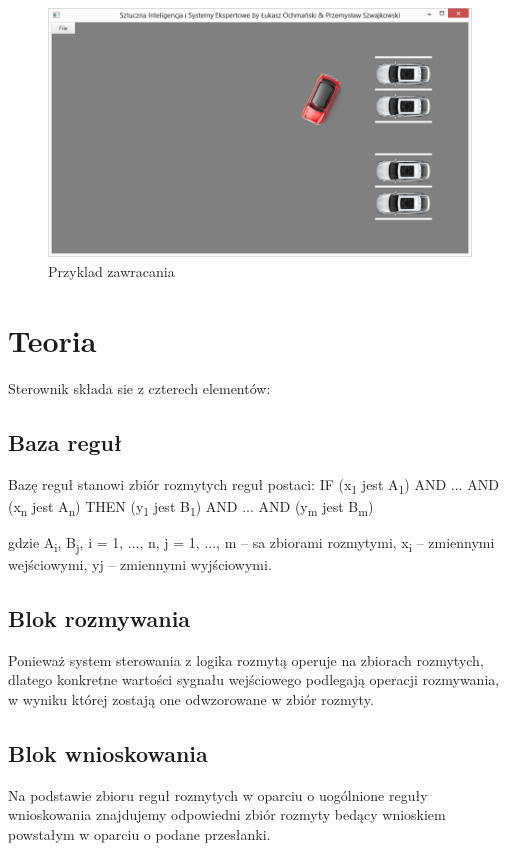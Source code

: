 \documentclass{classrep}
\begin{document}
\begin{figure}[ht]
\centering
			\includegraphics[scale=0.60]{pictures/Obraz12.png}
	\caption{Przyklad zawracania}
	\label{fig:Przyklad zawracania}
\end{figure}

\clearpage
\section{Teoria}
Sterownik składa sie z czterech elementów:
\subsection{Baza reguł}
Bazę reguł stanowi zbiór rozmytych reguł postaci:
IF (x\textsubscript{1} jest A\textsubscript{1}) AND ... AND (x\textsubscript{n} jest A\textsubscript{n})
THEN (y\textsubscript{1} jest B\textsubscript{1}) AND ... AND (y\textsubscript{m} jest B\textsubscript{m})

gdzie A\textsubscript{i}, B\textsubscript{j}, i = 1, ..., n, j = 1, ..., m – sa zbiorami rozmytymi, x\textsubscript{i} –
zmiennymi wejściowymi, yj – zmiennymi wyjściowymi.

\subsection{Blok rozmywania}
Ponieważ system sterowania z logika rozmytą operuje na zbiorach rozmytych,
dlatego konkretne wartości sygnału wejściowego podlegają operacji
rozmywania, w wyniku której zostają one odwzorowane w zbiór rozmyty.
\subsection{Blok wnioskowania}
Na podstawie zbioru reguł rozmytych w oparciu o uogólnione reguły
wnioskowania znajdujemy odpowiedni zbiór rozmyty bedący wnioskiem
powstałym w oparciu o podane przesłanki.
\end{document}
